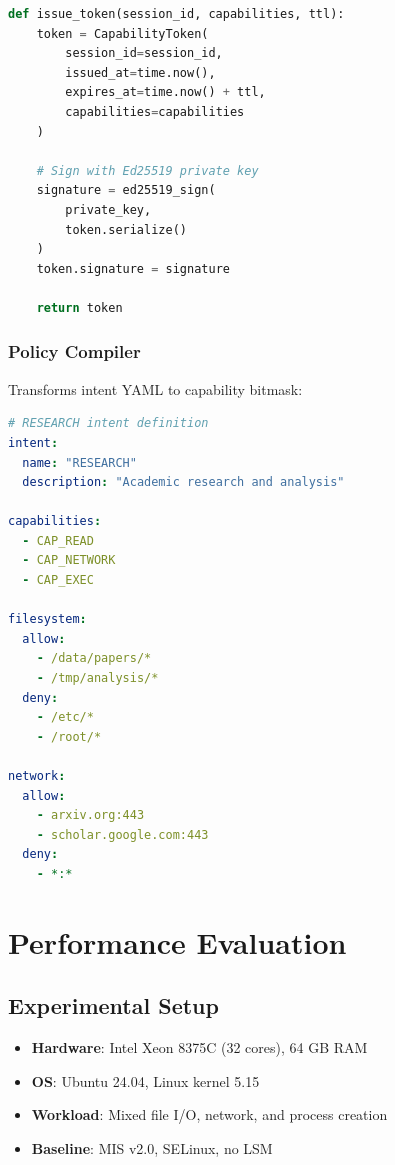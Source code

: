 \documentclass[11pt,a4paper]{article}
\begin{document}
\begin{lstlisting}[language=Python, caption=Token signing (pseudocode)]
def issue_token(session_id, capabilities, ttl):
    token = CapabilityToken(
        session_id=session_id,
        issued_at=time.now(),
        expires_at=time.now() + ttl,
        capabilities=capabilities
    )
    
    # Sign with Ed25519 private key
    signature = ed25519_sign(
        private_key, 
        token.serialize()
    )
    token.signature = signature
    
    return token
\end{lstlisting}

\subsubsection{Policy Compiler}

Transforms intent YAML to capability bitmask:

\begin{lstlisting}[language=yaml, caption=Intent compilation]
# RESEARCH intent definition
intent:
  name: "RESEARCH"
  description: "Academic research and analysis"
  
capabilities:
  - CAP_READ
  - CAP_NETWORK
  - CAP_EXEC

filesystem:
  allow:
    - /data/papers/*
    - /tmp/analysis/*
  deny:
    - /etc/*
    - /root/*

network:
  allow:
    - arxiv.org:443
    - scholar.google.com:443
  deny:
    - *:*
\end{lstlisting}

\section{Performance Evaluation}
\label{sec:evaluation}

\subsection{Experimental Setup}

\begin{itemize}
    \item \textbf{Hardware}: Intel Xeon 8375C (32 cores), 64 GB RAM
    \item \textbf{OS}: Ubuntu 24.04, Linux kernel 5.15
    \item \textbf{Workload}: Mixed file I/O, network, and process creation
    \item \textbf{Baseline}: MIS v2.0, SELinux, no LSM
\end{itemize}
\end{document}
